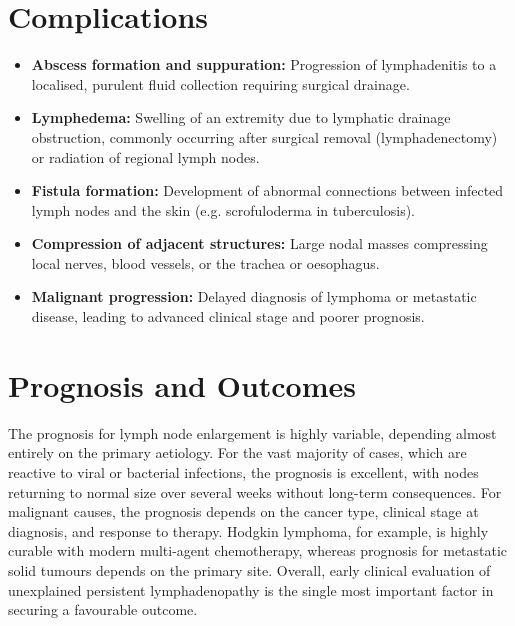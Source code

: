 \section*{Complications}
\begin{itemize}
    \item \textbf{Abscess formation and suppuration:} Progression of lymphadenitis to a localised, purulent fluid collection requiring surgical drainage.
    \item \textbf{Lymphedema:} Swelling of an extremity due to lymphatic drainage obstruction, commonly occurring after surgical removal (lymphadenectomy) or radiation of regional lymph nodes.
    \item \textbf{Fistula formation:} Development of abnormal connections between infected lymph nodes and the skin (e.g. scrofuloderma in tuberculosis).
    \item \textbf{Compression of adjacent structures:} Large nodal masses compressing local nerves, blood vessels, or the trachea or oesophagus.
    \item \textbf{Malignant progression:} Delayed diagnosis of lymphoma or metastatic disease, leading to advanced clinical stage and poorer prognosis.
\end{itemize}

\section*{Prognosis and Outcomes}
The prognosis for lymph node enlargement is highly variable, depending almost entirely on the primary aetiology. For the vast majority of cases, which are reactive to viral or bacterial infections, the prognosis is excellent, with nodes returning to normal size over several weeks without long-term consequences. For malignant causes, the prognosis depends on the cancer type, clinical stage at diagnosis, and response to therapy. Hodgkin lymphoma, for example, is highly curable with modern multi-agent chemotherapy, whereas prognosis for metastatic solid tumours depends on the primary site. Overall, early clinical evaluation of unexplained persistent lymphadenopathy is the single most important factor in securing a favourable outcome.

